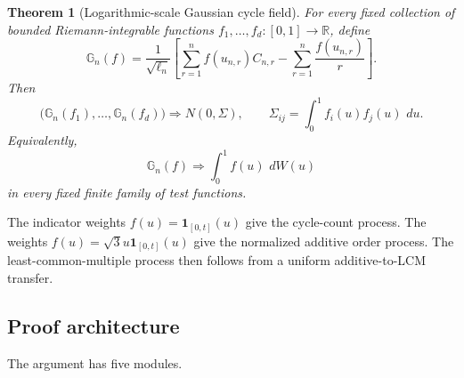 \documentclass[11pt]{article}
\newtheorem{theorem}{Theorem}[section]
\theoremstyle{definition}
\theoremstyle{remark}
\newcommand{\one}{\mathbf 1}
\newcommand{\dd}{\,d}
\newcommand{\R}{\mathbb R}
\begin{document}
\begin{theorem}[Logarithmic-scale Gaussian cycle field]
\label{thm:isonormal}
For every fixed collection of bounded Riemann-integrable functions
$f_1,\ldots,f_d:[0,1]\to\R$, define
\begin{equation}\label{eq:Gn-f}
 \mathbb G_n(f)
 =\frac1{\sqrt{\ell_n}}
 \left[
 \sum_{r=1}^n f(u_{n,r})C_{n,r}
 -\sum_{r=1}^n\frac{f(u_{n,r})}{r}
 \right].
\end{equation}
Then
\begin{equation}\label{eq:isonormal}
 \bigl(\mathbb G_n(f_1),\ldots,\mathbb G_n(f_d)\bigr)
 \Rightarrow N(0,\Sigma),
 \qquad
 \Sigma_{ij}=\int_0^1f_i(u)f_j(u)\,\dd u.
\end{equation}
Equivalently,
\[
 \mathbb G_n(f)\Rightarrow\int_0^1 f(u)\,\dd W(u)
\]
in every fixed finite family of test functions.
\end{theorem}

The indicator weights $f(u)=\one_{[0,t]}(u)$ give the cycle-count process.
The weights $f(u)=\sqrt3u\one_{[0,t]}(u)$ give the normalized additive order
process.  The least-common-multiple process then follows from a uniform
additive-to-LCM transfer.

\subsection*{Proof architecture}

The argument has five modules.
\end{document}
